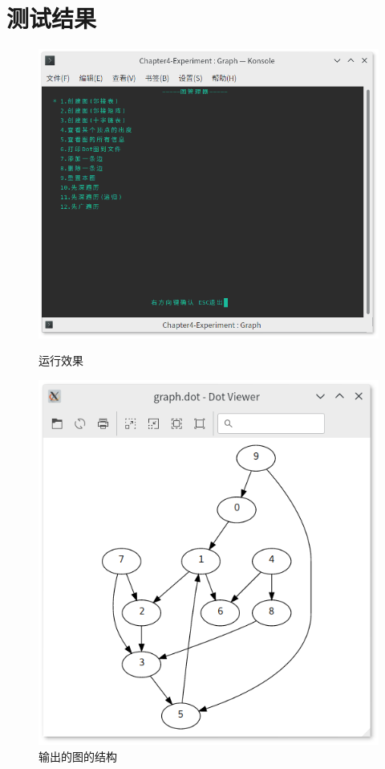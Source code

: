 \section{测试结果}
\begin{figure}[H]
    \begin{minipage}[c]{0.5\linewidth}
        \centering
        \includegraphics[width=\linewidth]{figures/Run}
        \caption{运行效果}
        \label{fig:test}
    \end{minipage}
    \begin{minipage}[c]{0.5\linewidth}
        \centering
        \includegraphics[width=\linewidth]{figures/GrathStructure}
        \caption{输出的图的结构}
        \label{fig:graph}
    \end{minipage}
\end{figure}